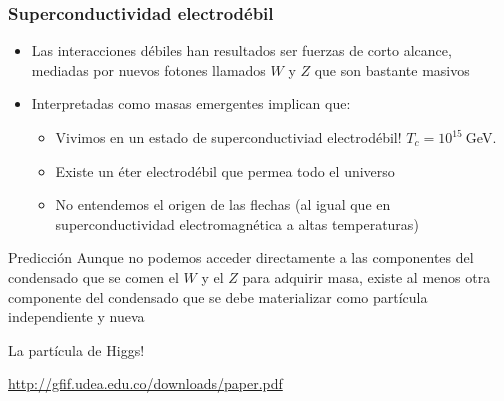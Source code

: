 \documentclass[%
xcolor=pdftex,dvipsnames,table%
]{beamer}
\begin{document}
\begin{frame}
  \frametitle{Superconductividad electrodébil}
  \begin{itemize}
  \item Las interacciones débiles han resultados ser fuerzas de corto alcance, mediadas por nuevos fotones llamados $W$ y $Z$ que son bastante masivos
  \item Interpretadas como masas emergentes implican que:
    \begin{itemize}
    \item Vivimos en un estado de superconductiviad electrodébil! $T_c=10^{15}\ $GeV.
    \item Existe un éter electrodébil que permea todo el universo
    \item No entendemos el origen de las flechas (al igual que en superconductividad electromagnética a altas temperaturas)
    \end{itemize}
  \end{itemize}

  \begin{block}{Predicción}
 Aunque no podemos acceder directamente a las componentes del condensado que se comen el $W$ y el $Z$ para adquirir masa, existe al menos otra componente del condensado que se debe materializar como partícula independiente y nueva
 \begin{center}
   La partícula de Higgs!
 \end{center}
  \end{block}

\url{http://gfif.udea.edu.co/downloads/paper.pdf}
\end{frame}
\end{document}
